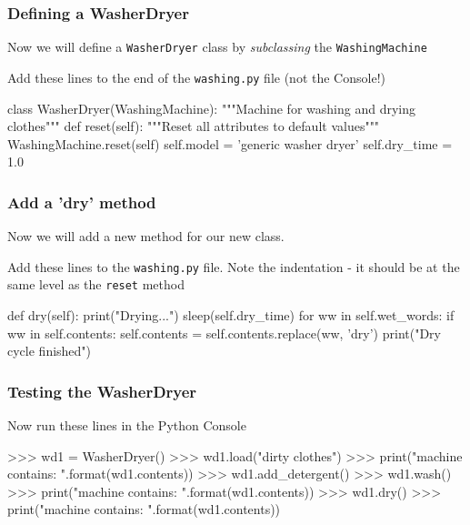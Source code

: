 \documentclass{beamer}
\begin{document}
\begin{frame}[fragile]
\frametitle{Defining a WasherDryer}
Now we will define a \texttt{WasherDryer} class by \emph{subclassing} the \texttt{WashingMachine}

Add these lines to the end of the \texttt{washing.py} file (not the Console!)
\begin{shaded}
\begin{code} 
class WasherDryer(WashingMachine):
    """Machine for washing and drying clothes"""
    def reset(self):
        """Reset all attributes to default values"""
        WashingMachine.reset(self)
        self.model = 'generic washer dryer'
        self.dry_time = 1.0
\end{code}
\end{shaded}
\end{frame}

\begin{frame}[fragile]
\frametitle{Add a 'dry' method}
Now we will add a new method for our new class.

Add these lines to the \texttt{washing.py} file. Note the indentation - 
it should be at the same level as the \texttt{reset} method
\begin{shaded}
\begin{code} 
    def dry(self):
        print("Drying...")
        sleep(self.dry_time)
        for ww in self.wet_words:
            if ww in self.contents:
                self.contents = self.contents.replace(ww, 
                                                   'dry')
        print("Dry cycle finished")
\end{code}
\end{shaded}
\end{frame}

\begin{frame}[fragile]
\frametitle{Testing the WasherDryer}

Now run these lines in the Python Console

\begin{code} 
>>> wd1 = WasherDryer()
>>> wd1.load("dirty clothes")
>>> print("machine contains: {}".format(wd1.contents))
>>> wd1.add_detergent()
>>> wd1.wash()
>>> print("machine contains: {}".format(wd1.contents))
>>> wd1.dry()
>>> print("machine contains: {}".format(wd1.contents))
\end{code}

\end{frame}
\end{document}
